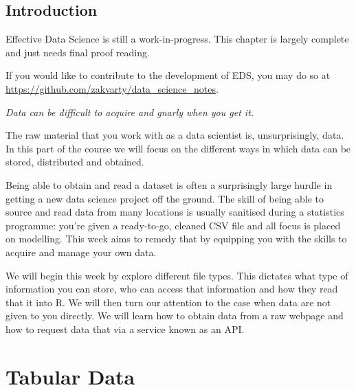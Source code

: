 \documentclass[
  letterpaper,
  DIV=11,
  numbers=noendperiod]{scrreprt}
\begin{document}
\section*{Introduction}\label{data-introduction}


\begin{tcolorbox}[enhanced jigsaw, leftrule=.75mm, bottomtitle=1mm, toprule=.15mm, colbacktitle=quarto-callout-note-color!10!white, breakable, colback=white, bottomrule=.15mm, opacityback=0, colframe=quarto-callout-note-color-frame, title=\textcolor{quarto-callout-note-color}{\faInfo}\hspace{0.5em}{Note}, titlerule=0mm, toptitle=1mm, opacitybacktitle=0.6, arc=.35mm, rightrule=.15mm, coltitle=black, left=2mm]

Effective Data Science is still a work-in-progress. This chapter is
largely complete and just needs final proof reading.

If you would like to contribute to the development of EDS, you may do so
at \url{https://github.com/zakvarty/data_science_notes}.

\end{tcolorbox}

\emph{Data can be difficult to acquire and gnarly when you get it.}

The raw material that you work with as a data scientist is,
unsurprisingly, data. In this part of the course we will focus on the
different ways in which data can be stored, distributed and obtained.

Being able to obtain and read a dataset is often a surprisingly large
hurdle in getting a new data science project off the ground. The skill
of being able to source and read data from many locations is usually
sanitised during a statistics programme: you're given a ready-to-go,
cleaned CSV file and all focus is placed on modelling. This week aims to
remedy that by equipping you with the skills to acquire and manage your
own data.

We will begin this week by explore different file types. This dictates
what type of information you can store, who can access that information
and how they read that it into R. We will then turn our attention to the
case when data are not given to you directly. We will learn how to
obtain data from a raw webpage and how to request data that via a
service known as an API.

\chapter{Tabular Data}\label{data-tabular}
\end{document}

